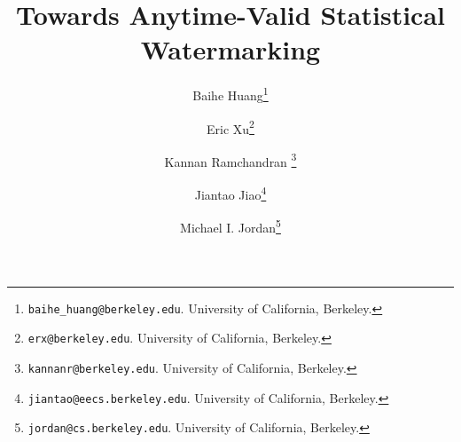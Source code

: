 \documentclass[12pt]{article}
\title{Towards Anytime-Valid Statistical Watermarking}
\theoremstyle{plain}
\theoremstyle{definition}
\theoremstyle{plain}
\theoremstyle{plain}
\begin{document}
\ifdefined\isarxiv
\author{
Baihe Huang\thanks{
  \texttt{baihe\_huang@berkeley.edu}. University of California, Berkeley. }
  \and
  Eric Xu\thanks{\texttt{erx@berkeley.edu}. University of California, Berkeley. }
  \and
  Kannan Ramchandran
  \thanks{
  \texttt{kannanr@berkeley.edu}. University of California, Berkeley. }
  \and
  Jiantao Jiao\thanks{
  \texttt{jiantao@eecs.berkeley.edu}. University of California, Berkeley. }
  \and
  Michael I. Jordan\thanks{
  \texttt{jordan@cs.berkeley.edu}. University of California, Berkeley. }
}
\date{}
\maketitle

\else
{}

\fi


\setlength{\abovedisplayskip}{3.2pt}
\setlength{\belowdisplayskip}{3.2pt}
\end{document}
